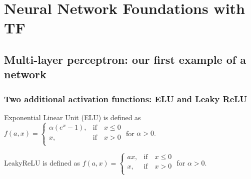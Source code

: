 \chapter{Neural Network Foundations with TF}
\section{Multi-layer perceptron: our first example of a network}
\subsection{Two additional activation functions: ELU and Leaky ReLU}
Exponential Linear Unit (ELU) is defined as
$
    f(a, x)=\begin{cases}
        \alpha(e^x-1), & \text{if} \quad x \leq 0 \\
        x,             & \text{if} \quad x > 0    \\
    \end{cases}
$
for $\alpha > 0$.

LeakyReLU is defined as
$
    f(a, x)=\begin{cases}
        ax, & \text{if} \quad x \leq 0 \\
        x,  & \text{if} \quad x > 0    \\
    \end{cases}
$
for $\alpha > 0$.